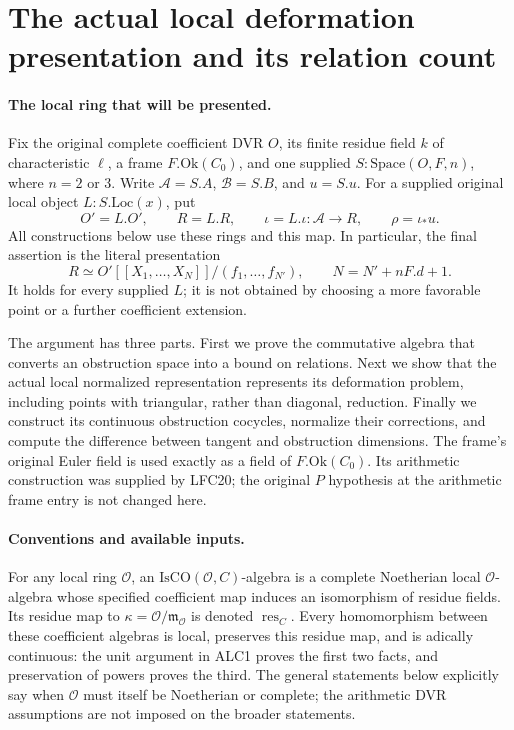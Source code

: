 \section{The actual local deformation presentation and its relation count}
\label{sec:arithmetic-presentations}

\paragraph{The local ring that will be presented.}
Fix the original complete coefficient DVR \(O\), its finite residue
field \(k\) of characteristic \(\ell\), a frame
\(F.\mathrm{Ok}(C_0)\), and one supplied
\(S:\mathrm{Space}(O,F,n)\), where \(n=2\) or \(3\).
Write \(\mathcal A=S.A\), \(\mathcal B=S.B\), and
\(u=S.u\).  For a supplied original local object
\(L:S.\mathrm{Loc}(x)\), put
\[
 O'=L.O',\qquad R=L.R,\qquad
 \iota=L.\iota:\mathcal A\longrightarrow R,
 \qquad \rho=\iota_*u.                                      \tag{APD.1}
\]
All constructions below use these rings and this map.  In particular,
the final assertion is the literal presentation
\[
 R\simeq O'[[X_1,\ldots,X_N]]/(f_1,\ldots,f_{N'}),
 \qquad N=N'+nF.d+1.                                      \tag{APD.2}
\]
It holds for every supplied \(L\); it is not obtained by choosing a
more favorable point or a further coefficient extension.

The argument has three parts.  First we prove the commutative algebra
that converts an obstruction space into a bound on relations.  Next
we show that the actual local normalized representation represents its
deformation problem, including points with triangular, rather than
diagonal, reduction.  Finally we construct its continuous obstruction
cocycles, normalize their corrections, and compute the difference
between tangent and obstruction dimensions.  The frame's original
Euler field is used exactly as a field of \(F.\mathrm{Ok}(C_0)\).
Its arithmetic construction was supplied by LFC20; the original
\(P\) hypothesis at the arithmetic frame entry is not changed here.

\paragraph{Conventions and available inputs.}
For any local ring \(\mathcal O\), an
\(\mathrm{IsCO}(\mathcal O,C)\)-algebra is a complete Noetherian
local \(\mathcal O\)-algebra whose specified coefficient map induces
an isomorphism of residue fields.  Its residue map to
\(\kappa=\mathcal O/\mathfrak m_{\mathcal O}\) is denoted
\(\operatorname{res}_C\).  Every homomorphism between these coefficient
algebras is local, preserves this residue map, and is adically
continuous: the unit argument in ALC1 proves the first two facts,
and preservation of powers proves the third.  The general statements
below explicitly say when \(\mathcal O\) must itself be Noetherian
or complete; the arithmetic DVR assumptions are not imposed on the
broader statements.

